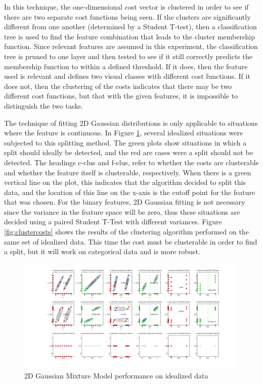 \documentclass[12pt]{article}
\begin{document}
In this technique, the one-dimensional cost vector is clustered in order to see if there are two separate cost functions being seen. If the clusters are significantly different from one another (determined by a Student T-test), then a classification tree is used to find the feature combination that leads to the cluster membership function. Since relevant features are assumed in this experiment, the classification tree is pruned to one layer and then tested to see if it still correctly predicts the membership function to within a defined threshold. If it does, then the feature used is relevant and defines two visual classes with different cost functions. If it does not, then the clustering of the costs indicates that there may be two different cost functions, but that with the given features, it is impossible to distinguish the two tasks. 

The technique of fitting 2D Gaussian distributions is only applicable to situations where the feature is continuous. In Figure \ref{fig:2Dgaussians}, several idealized situations were subjected to this splitting method. The green plots show situations in which a split should ideally be detected, and the red are cases were a split should not be detected. The headings c-clus and f-clus, refer to whether the costs are clusterable and whether the feature itself is clusterable, respectively. When there is a green vertical line on the plot, this indicates that the algorithm decided to split this data, and the location of this line on the x-axis is the cutoff point for the feature that was chosen. For the binary features, 2D Gaussian fitting is not necessary since the variance in the feature space will be zero, thus these situations are decided using a paired Student T-Test with different variances. Figure \ref{fig:clustercosts} shows the results of the clustering algorithm performed on the same set of idealized data. This time the cost must be clusterable in order to find a split, but it will work on categorical data and is more robust. 


\begin{figure}[ht]
  \centerline{
  \includegraphics[width=1.5\columnwidth]{2d_gaussians.png}}
  \caption{\label{fig_2d_gaussians} 2D Gaussian Mixture Model performance on idealized data}
  \label{fig:2Dgaussians}
\end{figure}
\end{document}
